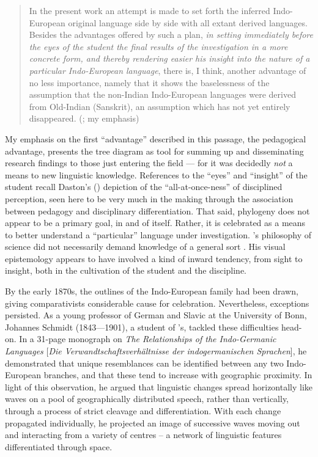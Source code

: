 \documentclass[output=paper]{langscibook}
\begin{document}
\begin{quotation}
\largerpage[1]In the present work an attempt is made to set forth the inferred Indo-European original language side by side with all extant derived languages. Besides the advantages offered by such a plan, \emph{in setting immediately before the eyes of the student the final results of the investigation in a more concrete form, and thereby rendering easier his insight into the nature of a particular Indo-European language}, there is, I think, another advantage of no less importance, namely that it shows the baselessness of the assumption that the non-Indian Indo-European languages were derived from Old-Indian (Sanskrit), an assumption which has not yet entirely disappeared. (\citealt[94]{Schleicher196718612}; my emphasis)
\end{quotation}

My emphasis on the first ``advantage'' described in this passage, the pedagogical advantage, presents the tree diagram as tool for summing up and disseminating research findings to those just entering the field — for {\Schleicher} it was decidedly \emph{not} a means to new linguistic knowledge. References to the ``eyes'' and ``insight'' of the student recall Daston's (\citeyear{Daston2008}) depiction of the ``all-at-once-ness'' of disciplined perception, seen here to be very much in the making through the association between pedagogy and disciplinary differentiation. That said, phylogeny does not appear to be a primary goal, in and of itself. Rather, it is celebrated as a means to better understand a ``particular'' language under investigation. {\Schleicher}'s philosophy of science did not necessarily demand knowledge of a general sort \citep{Nyhart2012}. His visual epistemology appears to have involved a kind of inward tendency, from sight to insight, both in the cultivation of the student and the discipline.

By the early 1870s, the outlines of the Indo-European family had been drawn, giving comparativists considerable cause for celebration. Nevertheless, exceptions persisted. As a young professor of German and Slavic at the University of Bonn, Johannes Schmidt (1843—1901), a student of {\Schleicher}'s, tackled these difficulties head-on. In a 31-page monograph on \emph{The Relationships of the Indo-Germanic Languages} [\emph{Die Verwandtschaftsverhältnisse der indo\-ger\-manischen Spra\-chen}], he demonstrated that unique resemblances can be identified between any two Indo-European branches, and that these tend to increase with geographic proximity. In light of this observation, he argued that linguistic changes spread horizontally like waves on a pool of geographically distributed speech, rather than vertically, through a process of strict cleavage and differentiation. With each change propagated individually, he projected an image of successive waves moving out and interacting from a variety of centres -- a network of linguistic features differentiated through space.
\end{document}
